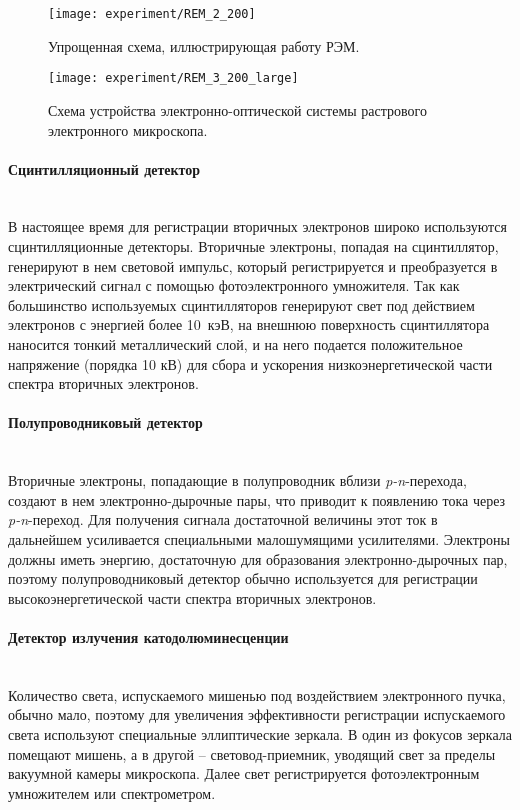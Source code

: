 \begin{figure}[t]
	\centering
	\texttt{[image: experiment/REM\_2\_200]}
	\vspace{0.5em}
	\caption{Упрощенная схема, иллюстрирующая работу РЭМ.}
	\label{fig:REM_2}
\end{figure}

\begin{figure}[h]
	\centering
	\texttt{[image: experiment/REM\_3\_200\_large]}
	\vspace{0.5em}
	\caption{Схема устройства электронно-оптической системы растрового электронного микроскопа.}
	\label{fig:REM_3}
\end{figure}

\paragraph{Сцинтилляционный детектор} \mbox{} \\
\indent В настоящее время для регистрации вторичных электронов широко используются сцинтилляционные детекторы.
Вторичные электроны, попадая на сцинтиллятор, генерируют в нем световой импульс, который регистрируется и преобразуется в электрический сигнал с помощью фотоэлектронного умножителя.
Так как большинство используемых сцинтилляторов генерируют свет под действием электронов с энергией более 10~кэВ, на внешнюю поверхность сцинтиллятора наносится тонкий металлический слой, и на него подается положительное напряжение (порядка 10 кВ) для сбора и ускорения низкоэнергетической части спектра вторичных электронов.

\paragraph{Полупроводниковый детектор} \mbox{} \\
\indent Вторичные электроны, попадающие в полупроводник вблизи \textit{p-n}-перехода, создают в нем электронно-дырочные пары, что приводит к появлению тока через \textit{p-n}-переход.
Для получения сигнала достаточной величины этот ток в дальнейшем усиливается специальными малошумящими усилителями.
Электроны должны иметь энергию, достаточную для образования электронно-дырочных пар, поэтому полупроводниковый детектор обычно используется для регистрации высокоэнергетической части спектра вторичных электронов.

\paragraph{Детектор излучения катодолюминесценции} \mbox{} \\
\indent Количество света, испускаемого мишенью под воздействием электронного пучка, обычно мало, поэтому для увеличения эффективности регистрации испускаемого света используют специальные эллиптические зеркала. В один из фокусов зеркала помещают мишень, а в другой -- световод-приемник, уводящий свет за пределы вакуумной камеры микроскопа. Далее свет регистрируется фотоэлектронным умножителем или спектрометром.

